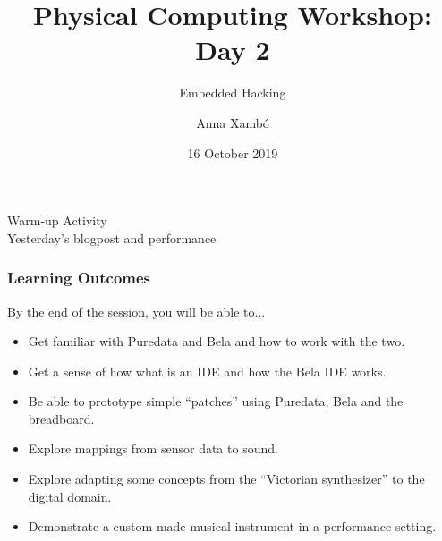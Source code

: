 \documentclass[screen, aspectratio=169]{beamer}
\title[PCW-d1]{Physical Computing Workshop: Day 2}
\subtitle{Embedded Hacking}
\author[A. Xamb{\'o}]{Anna Xamb{\'o}}
\institute[NTNU]{Department of Music, NTNU}
\date{16 October 2019}
\begin{document}
\begin{frame}
  \titlepage
\end{frame}
%
%
\usebackgroundtemplate{}
\begin{frame}
\frametitle{}
{\huge Warm-up Activity\\Yesterday's blogpost and performance }
\end{frame}
%
\begin{frame}
\frametitle{Learning Outcomes}
By the end of the session,  you will be able to...
\begin{itemize}
\item Get familiar with Puredata and Bela and how to work with the two.
\item Get a sense of how what is an IDE and how the Bela IDE works.
\item Be able to prototype simple ``patches'' using Puredata, Bela and the breadboard.
\item Explore mappings from sensor data to sound. 
\item Explore adapting some concepts from the ``Victorian synthesizer'' to the digital domain.
\item Demonstrate a custom-made musical instrument in a performance setting.
\end{itemize}
\end{frame}
%

\end{document}
